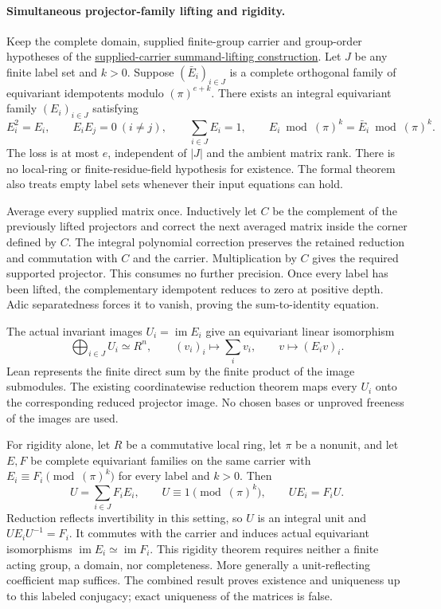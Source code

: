 \documentclass[11pt]{article}
\theoremstyle{definition}
\theoremstyle{remark}
\begin{document}
\paragraph{Simultaneous projector-family lifting and rigidity.}\label{book:x-construction-19}
Keep the complete domain, supplied finite-group carrier and group-order
hypotheses of the \hyperref[book:x-construction-18]{supplied-carrier summand-lifting construction}. Let $J$ be any finite label set and $k>0$. Suppose
$(\bar E_i)_{i\in J}$ is a complete orthogonal family of equivariant
idempotents modulo $(\pi)^{e+k}$. There exists an integral equivariant
family $(E_i)_{i\in J}$ satisfying
\[
E_i^2=E_i,\qquad E_iE_j=0\ (i\ne j),\qquad
\sum_{i\in J}E_i=1,\qquad
E_i\bmod(\pi)^k=\bar E_i\bmod(\pi)^k.
\]
The loss is at most $e$, independent of $|J|$ and the ambient matrix rank.
There is no local-ring or finite-residue-field hypothesis for existence.
The formal theorem also treats empty label sets whenever their input
equations can hold.

Average every supplied matrix once. Inductively let $C$ be the complement
of the previously lifted projectors and correct the next averaged matrix
inside the corner defined by $C$. The integral polynomial correction
preserves the retained reduction and commutation with $C$ and the carrier.
Multiplication by $C$ gives the required supported projector. This consumes
no further precision. Once every label has been lifted, the complementary
idempotent reduces to zero at positive depth. Adic separatedness forces it
to vanish, proving the sum-to-identity equation.

The actual invariant images $U_i=\operatorname{im}E_i$ give an equivariant
linear isomorphism
\[
\bigoplus_{i\in J}U_i\simeq R^n,
\qquad (v_i)_i\longmapsto\sum_i v_i,
\qquad v\longmapsto(E_iv)_i.
\]
Lean represents the finite direct sum by the finite product of the image
submodules. The existing coordinatewise reduction theorem maps every
$U_i$ onto the corresponding reduced projector image. No chosen bases or
unproved freeness of the images are used.

For rigidity alone, let $R$ be a commutative local ring, let $\pi$ be a
nonunit, and let $E,F$ be complete equivariant families on the same carrier
with $E_i\equiv F_i\pmod{(\pi)^k}$ for every label and $k>0$. Then
\[
U=\sum_{i\in J}F_iE_i,\qquad
U\equiv1\pmod{(\pi)^k},\qquad UE_i=F_iU.
\]
Reduction reflects invertibility in this setting, so $U$ is an integral
unit and $UE_iU^{-1}=F_i$. It commutes with the carrier and induces actual
equivariant isomorphisms $\operatorname{im}E_i\simeq\operatorname{im}F_i$.
This rigidity theorem requires neither a finite acting group, a domain,
nor completeness. More generally a unit-reflecting coefficient map suffices.
The combined result proves existence and uniqueness up to this labeled
conjugacy; exact uniqueness of the matrices is false.
\end{document}
